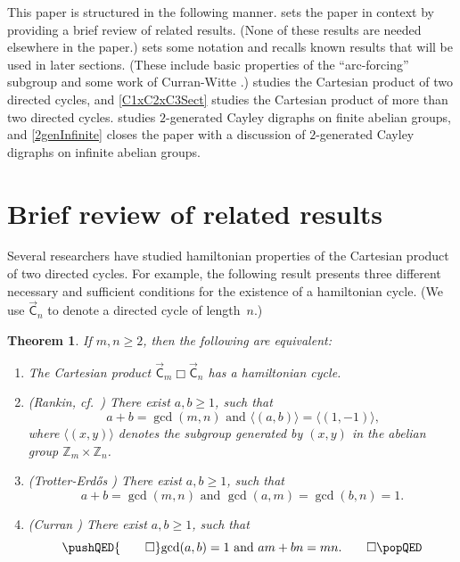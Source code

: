 \documentclass[11pt]{amsart}
\newtheorem{thm}[equation]{Theorem}
\theoremstyle{definition}
\numberwithin{case}{startcases}
\numberwithin{equation}{section}
\newcommand{\Z}{\mathbb{Z}}  %
\newcommand{\cartprod}{\mathbin{\Box}}
\begin{document}
	
	This paper is structured in the following manner.
	 sets the paper in context by providing a brief review of related results. (None of these results are needed elsewhere in the paper.) 
	 sets some notation and recalls known results that will be used in later sections. (These include basic properties of the ``arc-forcing'' subgroup and some work of Curran-Witte \cite{Curran}.) 
	 studies the Cartesian product of two directed cycles, and 
	\cref{C1xC2xC3Sect} studies the Cartesian product of more than two directed cycles. 
	 studies $2$-generated Cayley digraphs on finite abelian groups, and
	\cref{2genInfinite} closes the paper with a discussion of $2$-generated Cayley digraphs on infinite abelian groups.
	
	
	
	
	
	
	
	
	\section{Brief review of related results} \label{review}
	
	Several researchers have studied hamiltonian properties of the Cartesian product of two directed cycles. For example, the following result presents three different necessary and sufficient conditions for the existence of a hamiltonian cycle. (We use $\vec{\mathsf C}_n$ to denote a directed cycle of length~$n$.)
	
	\begin{thm} \label{HCiff}
		If $m,n \ge 2$, then the following are equivalent:
		\begin{enumerate}
			\item The Cartesian product $\vec{\mathsf C}_m \cartprod \vec{\mathsf C}_n$ has a hamiltonian cycle.
			\item \textup{(Rankin, cf.\ \cite{Rankin})} \label{HCiff-Rankin}
			There exist $a,b \ge 1$, such that 
			\[ \text{$a + b = \gcd(m,n)$ and $\langle (a,b) \rangle = \langle (1,-1) \rangle$,} \]
			where $\langle (x,y) \rangle$ denotes the subgroup generated by $(x,y)$ in the abelian group $\Z_m \times \Z_n$.
			\item \textup{(Trotter-Erd\H{o}s \cite{TrotterErdos})} There exist $a,b \ge 1$, such that 
			\[ \text{$a + b = \gcd(m,n)$ and $\gcd(a,m) = \gcd(b,n) = 1$.} \]
			\item \textup{(Curran \cite[Thm.~4.3]{witte1984survey})} There exist $a,b \ge 1$, such that 
			\[ 
			\pushQED{\qed} \text{$\gcd(a,b) = 1$ and $am + bn = mn$.} \qedhere
			\popQED 
			\]
		\end{enumerate}
	\end{thm}
	
\end{document}
